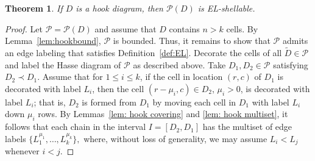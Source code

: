 \documentclass[letterpaper,10pt]{article}
\newtheorem{theorem}{Theorem}
\begin{document}
\begin{theorem}\label{thm:HrrCshell}
If $D$ is a hook diagram, then $\mathcal{P}(D)$ is EL-shellable.
\end{theorem}
\begin{proof}
Let $\mathcal{P}=\mathcal{P}(D)$ and assume that $D$ contains $n>k$ cells. By Lemma~\ref{lem:hookbound}, $\mathcal{P}$ is bounded. Thus, it remains to show that $\mathcal{P}$ admits an edge labeling that satisfies Definition~\ref{def:EL}. Decorate the cells of all $\widetilde{D}\in \mathcal{P}$ and label the Hasse diagram of $\mathcal{P}$ as described above. Take $D_1,D_2\in\mathcal{P}$ satisfying $D_2\prec D_1$. Assume that for $1\leq i\leq k$, if the cell in location $(r,c)$ of $D_1$ is decorated with label $L_i$, then the cell $(r-\mu_i,c)\in D_2$, $\mu_i> 0$, is decorated with label $L_i$; that is, $D_2$ is formed from $D_1$ by moving each cell in $D_1$ with label $L_i$ down $\mu_i$ rows. By Lemmas~\ref{lem: hook covering} and \ref{lem: hook multiset}, it follows that each chain in the interval $I=[D_2,D_1]$ has the multiset of edge labels $\{L_1^{\mu_1},\dots,L_k^{\mu_k}\},$ where, without loss of generality, we may assume $L_i<L_j$ whenever $i<j.$


\end{proof}
\end{document}
